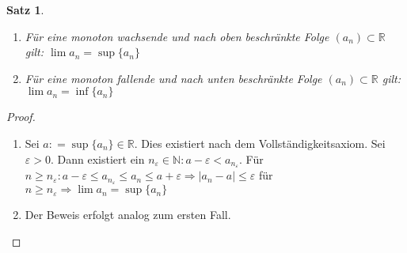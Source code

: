 \documentclass[ngerman,titlepage,twoside, parskip=half*]{scrreprt}
\newcommand*{\N}{\mathbb{N}}
\newcommand*{\R}{\mathbb{R}}
\theoremstyle{plain}
\newtheorem{theorem}{Satz}[section]
\theoremstyle{definition}
\theoremstyle{remark}
\newcommand*{\abs}[2][]{#1\lvert#2#1\rvert}
\newcommand*{\coloneqq}{\mathrel{\mathop:}=}
\begin{document}
\begin{theorem}
  \label{satz:monotoneFolge}
  \begin{enumerate}
  \item Für eine monoton wachsende und nach oben beschränkte Folge
    $(a_n) \subset \R$ gilt: $\lim a_n = \sup \{a_n\}$
  \item Für eine monoton fallende und nach unten beschränkte Folge $(a_n)
    \subset \R$ gilt: $\lim a_n = \inf \{a_n\}$
  \end{enumerate}
\end{theorem}
\begin{proof}
\begin{enumerate}
\item Sei $a \coloneqq \sup \{a_n\} \in \R$. Dies existiert nach dem
  Vollständigkeitsaxiom. Sei $\varepsilon > 0$. Dann existiert ein
  $n_{\varepsilon} \in \N \colon a-\varepsilon < a_{n_{\varepsilon}}$. Für
  $n \geq n_{\varepsilon} \colon a-\varepsilon \leq a_{n_{\varepsilon}}
  \leq a_n \leq a+\varepsilon\Rightarrow \abs{a_n-a} \leq \varepsilon$ für
  $n \geq n_{\varepsilon} \Rightarrow \lim a_n= \sup \{a_n\}$
\item Der Beweis erfolgt analog zum ersten Fall.
\end{enumerate}
\end{proof}
\end{document}

